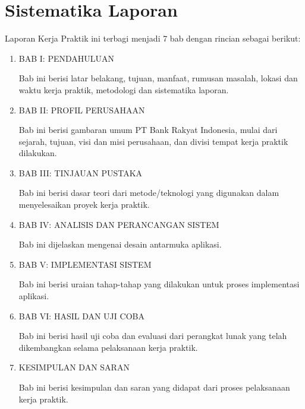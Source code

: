 \section{Sistematika Laporan}
Laporan Kerja Praktik ini terbagi menjadi 7 bab dengan rincian sebagai berikut:
	\begin{enumerate}
	\item BAB I: PENDAHULUAN
	
	Bab ini berisi latar belakang, tujuan, manfaat, rumusan masalah, lokasi dan waktu kerja praktik, metodologi dan sistematika laporan.
		
	\item BAB II: PROFIL PERUSAHAAN
		
	Bab ini berisi gambaran umum PT Bank Rakyat Indonesia, mulai dari sejarah, tujuan, visi dan misi perusahaan, dan divisi tempat kerja praktik dilakukan.
		
	\item BAB III: TINJAUAN PUSTAKA
		
	Bab ini berisi dasar teori dari metode/teknologi yang digunakan dalam menyelesaikan proyek kerja praktik.
		
	\item BAB IV: ANALISIS DAN PERANCANGAN SISTEM
		
	Bab ini dijelaskan mengenai desain antarmuka aplikasi.
		
	\item BAB V: IMPLEMENTASI SISTEM
		
	Bab ini berisi uraian tahap-tahap yang dilakukan untuk proses implementasi aplikasi.
		
	\item BAB VI: HASIL DAN UJI COBA
	
	Bab ini berisi hasil uji coba dan evaluasi dari perangkat lunak yang telah dikembangkan selama pelaksanaan kerja praktik.
	
	\item KESIMPULAN DAN SARAN
	
	Bab ini berisi kesimpulan dan saran yang didapat dari proses pelaksanaan kerja praktik.
	\end{enumerate}

\cleardoublepage
